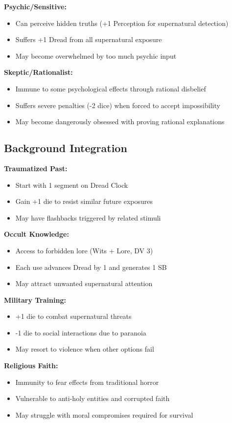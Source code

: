 \documentclass[11pt]{article}
\begin{document}
\textbf{Psychic/Sensitive:}
\begin{itemize}
\item Can perceive hidden truths (+1 Perception for supernatural detection)
\item Suffers +1 Dread from all supernatural exposure
\item May become overwhelmed by too much psychic input
\end{itemize}

\textbf{Skeptic/Rationalist:}
\begin{itemize}
\item Immune to some psychological effects through rational disbelief
\item Suffers severe penalties (-2 dice) when forced to accept impossibility
\item May become dangerously obsessed with proving rational explanations
\end{itemize}

\subsection{Background Integration}

\textbf{Traumatized Past:}
\begin{itemize}
\item Start with 1 segment on Dread Clock
\item Gain +1 die to resist similar future exposures
\item May have flashbacks triggered by related stimuli
\end{itemize}

\textbf{Occult Knowledge:}
\begin{itemize}
\item Access to forbidden lore (Wits + Lore, DV 3)
\item Each use advances Dread by 1 and generates 1 SB
\item May attract unwanted supernatural attention
\end{itemize}

\textbf{Military Training:}
\begin{itemize}
\item +1 die to combat supernatural threats
\item -1 die to social interactions due to paranoia
\item May resort to violence when other options fail
\end{itemize}

\textbf{Religious Faith:}
\begin{itemize}
\item Immunity to fear effects from traditional horror
\item Vulnerable to anti-holy entities and corrupted faith
\item May struggle with moral compromises required for survival
\end{itemize}
\end{document}
